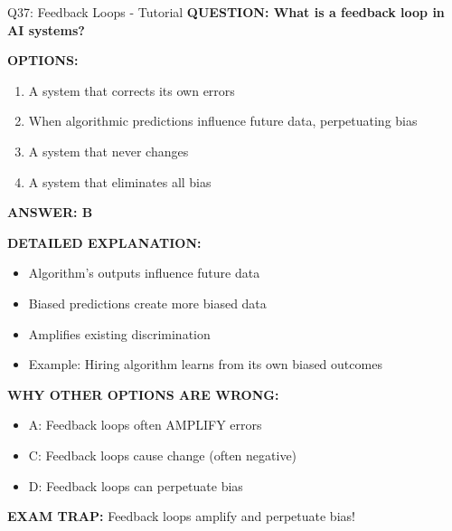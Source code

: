 \documentclass[8pt]{beamer}
\begin{document}
	\begin{frame}{Q37: Feedback Loops - Tutorial}
		\fontsize{6.5}{7.5}\selectfont
		\textbf{QUESTION: What is a feedback loop in AI systems?}
		
		\vspace{0.1cm}
		\textbf{OPTIONS:}
		\begin{enumerate}
			\item A system that corrects its own errors
			\item When algorithmic predictions influence future data, perpetuating bias
			\item A system that never changes
			\item A system that eliminates all bias
		\end{enumerate}
		
		\vspace{0.1cm}
		\textcolor{myblue}{\textbf{ANSWER: B}}
		
		\vspace{0.1cm}
		\textbf{DETAILED EXPLANATION:}
		\begin{itemize}
			\item Algorithm's outputs influence future data
			\item Biased predictions create more biased data
			\item Amplifies existing discrimination
			\item Example: Hiring algorithm learns from its own biased outcomes
		\end{itemize}
		
		\vspace{0.1cm}
		\textcolor{myred}{\textbf{WHY OTHER OPTIONS ARE WRONG:}}
		\begin{itemize}
			\item \textcolor{myred}{A:} Feedback loops often AMPLIFY errors
			\item \textcolor{myred}{C:} Feedback loops cause change (often negative)
			\item \textcolor{myred}{D:} Feedback loops can perpetuate bias
		\end{itemize}
		
		\textcolor{myred}{\textbf{EXAM TRAP:}} Feedback loops \textcolor{myblue}{amplify and perpetuate bias}!
	\end{frame}
	
\end{document}
